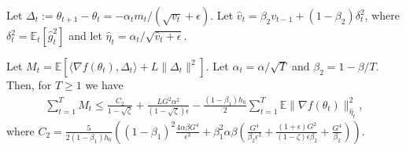 \medskip


Let $\Delta_t := \theta_{t+1} - \theta_t = -\alpha_t m_t/(\sqrt{v_t}+\epsilon)$. Let $\hat{v}_t = \beta_2 v_{t-1} + (1-\beta_2) \delta_t^2$, where $\delta_t^2 = \mathbb{E}_t \left[\hat{g}_t^2\right]$ and let $\hat{\eta}_t = \alpha_t/\sqrt{\hat{v}_t + \epsilon}$. 


\begin{lemma}\label{lem1-006}
Let $M_t = \mathbb{E} \left[\langle \nabla f(\theta_{t}), \Delta_{t}\rangle + L\|\Delta_{t}\|^2\right]$. Let $\alpha_t = \alpha/\sqrt T$ and $\beta_2 = 1-\beta/T$. Then, for $T\geq 1$ we have
\begin{equation}\label{1-037}
\begin{split}
\sum_{t=1}^T M_t 
\leq \frac{C_2}{1-\sqrt{\zeta}} + \frac{LG^2\alpha^2}{(1-\sqrt{\zeta})\epsilon} - \frac{(1-\beta_1)h_0}{2}\sum_{t=1}^T\mathbb{E} \|\nabla f(\theta_t)\|_{\hat{\eta}_t}^2,
\end{split}
\end{equation}
where $C_2 = \frac{5}{2(1-\beta_1)h_0 } \left((1-\beta_1)^2 \frac{4\alpha \beta G^4}{\epsilon^3} + \beta_1^2 \alpha\beta \left(\frac{G^4}{\beta_2 \epsilon^3} + \frac{(1+\epsilon) G^2}{(1-\zeta) \epsilon \beta_2} + \frac{G^4}{\beta_2}\right)\right).$
\end{lemma}

